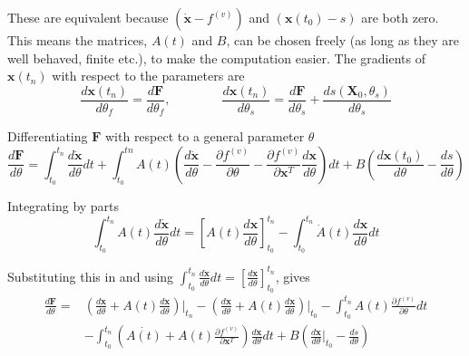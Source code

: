 \documentclass{article}
\theoremstyle{remark}
\theoremstyle{definition}
\begin{document}
These are equivalent because $(\dot{\mathbf{x}} - f^{(v)})$ and $(\mathbf{x}(t_{0}) - s)$ are both zero. This means the matrices, $A(t)$ and $B$, can be chosen freely (as long as they are well behaved, finite etc.), to make the computation easier. The gradients of $\mathbf{x}(t_{n})$ with respect to the parameters are
\begin{equation}
\label{eqn: dxdtheta}
    \frac{d\mathbf{x}(t_{n})}{d\theta_{f}} = \frac{d\mathbf{F}}{d\theta_{f}},
    \qquad
    \qquad
    \frac{d\mathbf{x}(t_{n})}{d\theta_{s}} = \frac{d\mathbf{F}}{d\theta_{s}} + \frac{ds(\mathbf{X}_{0}, \theta_{s})}{d\theta_{s}}
\end{equation}

Differentiating $\mathbf{F}$ with respect to a general parameter $\theta$
\begin{equation}
    \frac{d\mathbf{F}}{d\theta} = \int_{t_{0}}^{t_{n}}\frac{d\dot{\mathbf{x}}}{d\theta} dt
    + \int_{t_{0}}^{t{n}}A(t)\left(
    \frac{d\dot{\mathbf{x}}}{d\theta} - \frac{\partial f^{(v)}}{\partial \theta} - \frac{\partial f^{(v)}}{\partial \mathbf{x}^{T}}\frac{d\mathbf{x}}{d\theta}
    \right)dt
    +B\left(
    \frac{d\mathbf{x}(t_{0})}{d\theta} - \frac{ds}{d\theta}
    \right)
\end{equation}

Integrating by parts
\begin{equation}
    \int_{t_{0}}^{t_{n}}A(t)\frac{d\dot{\mathbf{x}}}{d\theta}dt =
    \left[
    A(t)\frac{d\mathbf{x}}{d\theta}
    \right]_{t_{0}}^{t_{n}} - \int_{t_{0}}^{t_{n}}\dot{A}(t)\frac{d\mathbf{x}}{d\theta}dt
\end{equation}

Substituting this in and using $\int_{t_{0}}^{t_{n}}\frac{d\dot{\mathbf{x}}}{d\theta}dt = [\frac{d\mathbf{x}}{d\theta}]^{t_{n}}_{t_{0}}$, gives
\begin{equation}
\label{eqn: dFdthet}
\begin{aligned}
    \frac{d\mathbf{F}}{d\theta} = 
    &\left(
    \frac{d\mathbf{x}}{d\theta} + A(t)\frac{d\mathbf{x}}{d\theta}
    \right)\Biggr\vert_{t_{n}}
    -\left(
    \frac{d\mathbf{x}}{d\theta} + A(t)\frac{d\mathbf{x}}{d\theta}
    \right)\Biggr\vert_{t_{0}}
    - \int_{t_{0}}^{t_{n}}A(t)\frac{\partial f^{(v)}}{\partial \theta}dt\\
    &- \int_{t_{0}}^{t_{n}}\left(
    \dot{A(t)}+A(t)\frac{\partial f^{(v)}}{\partial \mathbf{x}^{T}}
    \right)\frac{d\mathbf{x}}{d\theta}dt
    + B\left(\frac{d\mathbf{x}}{d\theta}\Biggr\vert_{t_{0}} - \frac{ds}{d\theta}
    \right)
\end{aligned}
\end{equation}
\end{document}
